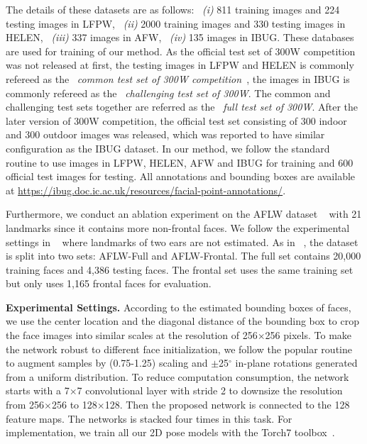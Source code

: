 \documentclass[10pt,journal,compsoc]{IEEEtran}
\begin{document}
The details of these datasets are as follows: ~\textit{(i)} 811 training images and 224 testing images in LFPW, ~\textit{(ii)} 2000 training images and 330 testing images in HELEN, ~\textit{(iii)} 337 images in AFW, ~\textit{(iv)} 135 images in IBUG.
These databases are used for training of our method.
As the official test set of 300W competition~\cite{sagonas2013300} was not released at first, the testing images in LFPW and HELEN is commonly refereed as the ~\textit{common test set of 300W competition~\cite{sagonas2013300}}, the images in IBUG is commonly refereed as the ~\textit{challenging test set of 300W}.
The common and challenging test sets together are referred as the ~\textit{full test set of 300W}.
After the later version of 300W competition, the official test set consisting of 300 indoor and 300 outdoor images was released, which was reported to have similar configuration as the IBUG dataset.
In our method, we follow the standard routine to use images in LFPW, HELEN, AFW and IBUG for training and 600 official test images for testing.
All annotations and bounding boxes are available at \url{https://ibug.doc.ic.ac.uk/resources/facial-point-annotations/}.

Furthermore, we conduct an ablation experiment on the AFLW dataset ~\cite{koestinger11a} with 21 landmarks since it contains more non-frontal faces.
We follow the experimental settings in ~\cite{lv2017deep,zhu2016unconstrained} where landmarks of two ears are not estimated.
As in ~\cite{zhu2016unconstrained}, the dataset is split into two sets: AFLW-Full and AFLW-Frontal. The full set contains 20,000 training faces and 4,386 testing faces. The frontal set uses the same training set but only uses 1,165 frontal faces for evaluation.

\noindent \textbf{Experimental Settings.} According to the estimated bounding boxes of faces, we use the center location and the diagonal distance of the bounding box to crop the face images into similar scales at the resolution of 256$\times$256 pixels. To make the network robust to different face initialization, we follow the popular routine ~\cite{zhang2014coarse,trigeorgis2016mnemonic} to augment samples by (0.75-1.25) scaling and $\pm$25$^\circ$ in-plane rotations generated from a uniform distribution. To reduce computation consumption, the network starts with a 7$\times$7 convolutional layer with stride 2 to downsize the resolution  from 256$\times$256 to 128$\times$128. Then the proposed network is connected to the 128 feature maps.  The networks is stacked four times in this task. For implementation, we train all our 2D pose models with the Torch7 toolbox~\cite{collobert2011torch7}.
\end{document}
